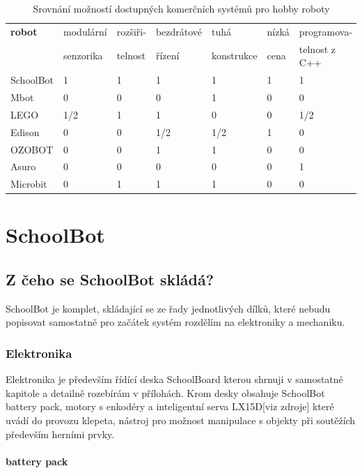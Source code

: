 \documentclass{template/socthesis}
\begin{document}
\begin{table}[h]
	\centering
	\begin{tabular}{|l|l|l|l|l|l|l|}
		\hline
		\textbf{robot }			& modulární   & rozšiři- & bezdrátové  & tuhá  & nízká & programova- \\
		 & senzorika & telnost & řízení & konstrukce & cena & telnost z C++ \\
		 \hline
		SchoolBot 		& 1 				& 1 			& 1 			& 1 			& 1 		& 1	\\ 
		Mbot 			& 0 				& 0 			& 0 			& 1 			& 0			& 0	\\ 
		LEGO 	& 1/2 				& 1 			& 1 			& 0 			& 0			& 1/2	\\ 
		Edison 			& 0 				& 0 			& 1/2 			& 1/2 			& 1			& 0	\\ 
		OZOBOT			& 0					& 0				& 1 			& 1				& 0			& 0	\\
		Asuro			& 0					& 0				& 0 			& 0				& 0			& 1	\\
		Microbit		& 0					& 1				& 1 			& 1				& 0			& 0	\\
		\hline
	\end{tabular}
	\caption{Srovnání možností dostupných komerčních systémů pro hobby roboty}
\end{table}

\chapter{SchoolBot}

\section{Z čeho se SchoolBot skládá?}
SchoolBot je komplet, skládající se ze řady jednotlivých dílků, které nebudu popisovat samostatně pro začátek systém rozdělím na elektroniky a mechaniku.

\subsection{Elektronika}

Elektronika je především řídící deska SchoolBoard kterou shrnuji v samostatné kapitole a detailně rozebírám v přílohách. Krom desky obsahuje SchoolBot battery pack, motory s enkodéry a inteligentní serva LX15D[viz zdroje] které uvádí do provozu klepeta, nástroj pro možnost manipulace s objekty při soutěžích především herními prvky.

\subsubsection{battery pack}
\end{document}
